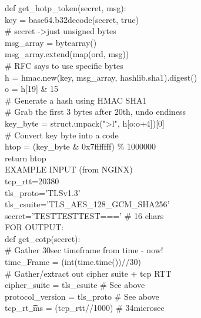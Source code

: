 \documentclass[a4paper, 11pt]{article} 				%
\begin{document}
\noindent
def get\_hotp\_token(secret, msg):\\
\indent key = base64.b32decode(secret, true)\\

\# secret -\textgreater just unsigned bytes\\
\indent msg\_array = bytearray()\\
\indent msg\_array.extend(map(ord, msg))\\

\# RFC says to use specific bytes\\
\indent h = hmac.new(key, msg\_array, hashlib.sha1).digest()\\
\indent o = h[19] \& 15\\

\# Generate a hash using HMAC SHA1\\
\indent \# Grab the first 3 bytes after 20th, undo endiness\\
\indent key\_byte = struct.unpack("\textgreater l", h[o:o+4])[0]\\
\indent \# Convert key byte into a code\\
\indent htop =  (key\_byte \& 0x7fffffff) \% 1000000\\
\indent return htop\\

\noindent
EXAMPLE INPUT (from NGINX)\\
\noindent
tcp\_rtt=20380\\
\noindent
tls\_proto='TLSv1.3'\\
\noindent
tls\_csuite='TLS\_AES\_128\_GCM\_SHA256'\\
\noindent
secret='TESTTESTTEST===' \# 16 chars\\

\noindent
FOR OUTPUT:\\
\noindent
def get\_cotp(secret):\\
\indent \# Gather 30sec timeframe from time - now!\\
\indent time\_Frame = (int(time.time())//30)\\
\indent \# Gather/extract out cipher suite + tcp RTT\\
\indent cipher\_suite = tls\_csuite 		         \# See above\\
\indent protocol\_version = tls\_proto		         \# See above\\
\indent tcp\_rt\t\_ms = (tcp\_rtt//1000)		         \# 34microsec\\     
\end{document}
